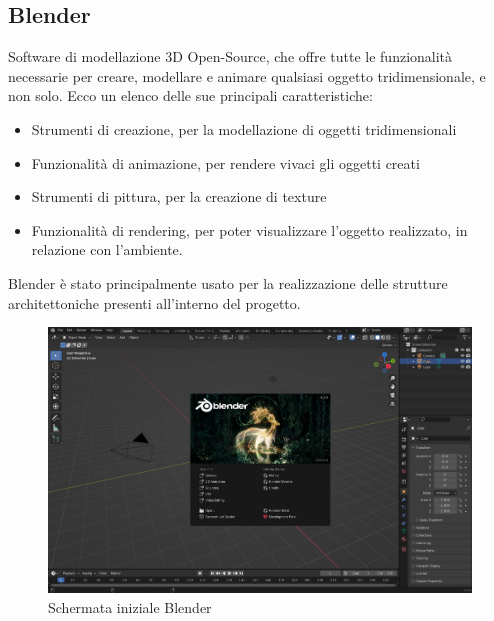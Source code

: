 \documentclass[10pt,a4paper]{article}
\begin{document}
    \subsection{Blender}
    Software di modellazione 3D Open-Source, che offre tutte le funzionalità necessarie per creare, modellare e animare qualsiasi oggetto tridimensionale, e non solo. Ecco un elenco delle sue principali caratteristiche:
    \begin{itemize}
    	\item Strumenti di creazione, per la modellazione di oggetti tridimensionali
    	\item Funzionalità di animazione, per rendere vivaci gli oggetti creati
        \item Strumenti di pittura, per la creazione di texture
    	\item Funzionalità di rendering, per poter visualizzare l'oggetto realizzato, in relazione con l'ambiente.
    \end{itemize}
    Blender è stato principalmente usato per la realizzazione delle strutture architettoniche presenti all'interno del progetto.
    \begin{figure}[H]
    	\centering
    	\includegraphics[width=0.7\linewidth]{image/blender}
    	\caption{Schermata iniziale Blender}
    	\label{fig:Blender}
    \end{figure}
\end{document}
